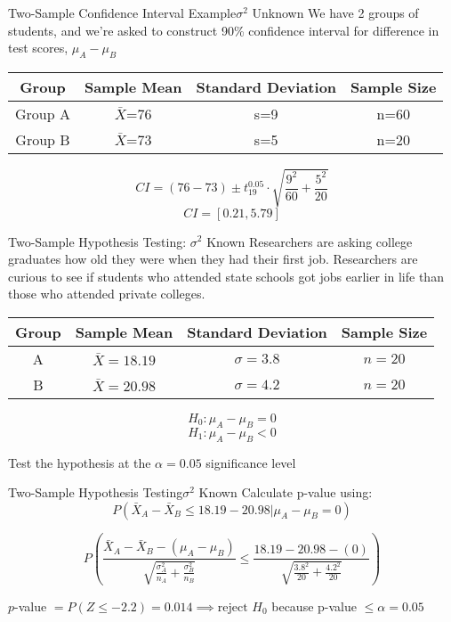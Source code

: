 \documentclass{beamer}
\begin{document}
\begin{frame}{Two-Sample Confidence Interval Example}{$\sigma^2$ Unknown}
	We have 2 groups of students, and we're asked to construct 90\% confidence interval for difference in test scores, $\mu_A-\mu_B$
	\begin{center}
		\begin{tabular}{|c|c|c|c|}
			\hline
			\textbf{Group} & \textbf{Sample Mean}  & \textbf{Standard Deviation} & \textbf{Sample Size} \\
			\hline
			Group A & $\bar{X}$=76 & s=9 & n=60 \\
			\hline
			Group B  & $\bar{X}$=73 & s=5 & n=20 \\
			\hline
		\end{tabular}
	\end{center}

	\[
		CI=(76-73) \pm t^{0.05}_{19} \cdot \sqrt{\frac{9^2}{60}+\frac{5^2}{20}}
	\]
	\[
		CI=[0.21, 5.79]
	\]
\end{frame}

\begin{frame}{Two-Sample Hypothesis Testing: $\sigma^2$ Known}
	Researchers are asking college graduates how old they were when they had their first job. Researchers are curious to see if students who attended state schools got jobs earlier in life than those who attended private colleges.

	\begin{center}
		\begin{tabular}{|c|c|c|c|}
			\hline
			\textbf{Group} & \textbf{Sample Mean}  & \textbf{Standard Deviation} & \textbf{Sample Size} \\
			\hline
			A & $\bar{X}=18.19$ & $\sigma=3.8$ & $n = 20$ \\
			\hline
			\rule{0pt}{15pt} B & $\bar{X}=20.98$ & $\sigma=4.2$ & $n = 20$ \\
			\hline
		\end{tabular}
	\end{center}
	
	\[ 
		H_0: \mu_A - \mu_B = 0 
	\]
	\[ 
		H_1: \mu_A - \mu_B <0 
	\]
	
	Test the hypothesis at the $\alpha=0.05$ significance level
	
\end{frame}

\begin{frame}{Two-Sample Hypothesis Testing}{$\sigma^2$ Known}
	Calculate p-value using:
	\[
		P(\bar{X}_A-\bar{X}_B\leq 18.19-20.98 | \mu_A-\mu_B=0)
	\]
	
	\[ 
		P\left(\frac{\bar{X}_A-\bar{X}_B-(\mu_A-\mu_B)}{\sqrt{\frac{\sigma_A^2}{n_A} + \frac{\sigma_B^2}{n_B}}} \leq \frac{18.19-20.98 - (0)}{\sqrt{\frac{3.8^2}{20}+\frac{4.2^2}{20}}} \right)
	\]
	
	\vspace{5mm}
	$p$-value $= P(Z \leq -2.2) = 0.014 \implies \text{reject } H_0$ because p-value $\leq \alpha=0.05$
\end{frame}
\end{document}
